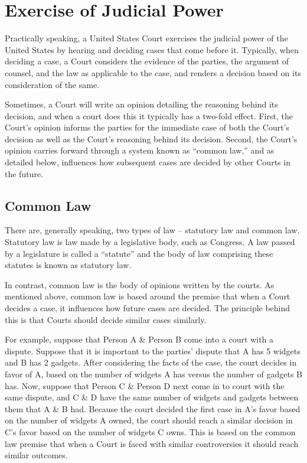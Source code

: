 \section{Exercise of Judicial Power}


Practically speaking, a United States Court exercises the judicial power of the United States by hearing and deciding cases that come before it.
Typically, when deciding a case, a Court considers the evidence of the parties, the argument of counsel, and the law as applicable to the case, and renders a decision based on its consideration of the same.  

Sometimes, a Court will write an opinion detailing the reasoning behind its decision, and when a court does this it typically has a two-fold effect.  First, the Court's opinion informs the parties for the immediate case of both the Court's decision as well as the Court's reasoning behind its decision.  Second, the Court's opinion carries forward through a system known as ``common law,'' and as detailed below, influences how subsequent cases are decided by other Courts in the future.


\subsection{Common Law}

There are, generally speaking, two types of law -- statutory law and common law.  Statutory law is law made by a legislative body, such as Congress.  A law passed by a legislature is called a ``statute'' and the body of law comprising these statutes is known as statutory law.

In contrast, common law is the body of opinions written by the courts.  As mentioned above, common law is based around the premise that when a Court decides a case, it influences how future cases are decided.  The principle behind this is that Courts should decide similar cases similarly.  

For example, suppose that Person A \& Person B come into a court with a dispute.  Suppose that it is important to the parties' dispute that A has 5 widgets and B has 2 gadgets.  After considering the facts of the case, the court decides in favor of A, based on the number of widgets A has versus the number of gadgets B has.  Now, suppose that Person C \& Person D next come in to court with the same dispute, and C \& D have the same number of widgets and gadgets between them that A \& B had.  Because the court decided the first case in A's favor based on the number of widgets A owned, the court should reach a similar decision in C's favor based on the number of widgets C owns.  This is based on the common law premise that when a Court is faced with similar controversies it should reach similar outcomes.

